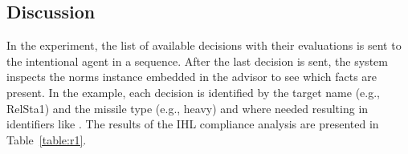 %
%
%
%
\subsection{Discussion}

In the experiment, the list of available decisions with their evaluations is sent to the intentional agent in a sequence. After the last decision is sent, the system inspects the norms instance embedded in the advisor to see which facts are present. In the example, each decision is identified by the target name (e.g., RelSta1) and the missile type (e.g., heavy) and where needed resulting in identifiers like . The results of the IHL compliance analysis are presented in Table~\ref{table:r1}. 

